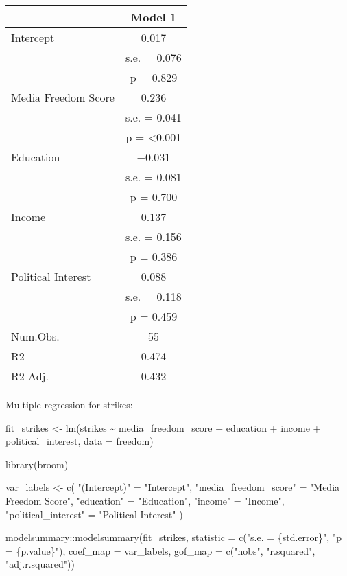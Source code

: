 \documentclass[
]{article}
\newenvironment{Shaded}{\begin{snugshade}}{\end{snugshade}}
\newcommand{\AttributeTok}[1]{\textcolor[rgb]{0.77,0.63,0.00}{#1}}
\newcommand{\FunctionTok}[1]{\textcolor[rgb]{0.00,0.00,0.00}{#1}}
\newcommand{\NormalTok}[1]{#1}
\newcommand{\OtherTok}[1]{\textcolor[rgb]{0.56,0.35,0.01}{#1}}
\newcommand{\SpecialCharTok}[1]{\textcolor[rgb]{0.00,0.00,0.00}{#1}}
\newcommand{\StringTok}[1]{\textcolor[rgb]{0.31,0.60,0.02}{#1}}
\begin{document}
\begin{table}
\centering
\begin{tabular}[t]{lc}
\toprule
  & Model 1\\
\midrule
Intercept & \num{0.017}\\
 & s.e. = \num{0.076}\\
 & p = \num{0.829}\\
Media Freedom Score & \num{0.236}\\
 & s.e. = \num{0.041}\\
 & p = \num{<0.001}\\
Education & \num{-0.031}\\
 & s.e. = \num{0.081}\\
 & p = \num{0.700}\\
Income & \num{0.137}\\
 & s.e. = \num{0.156}\\
 & p = \num{0.386}\\
Political Interest & \num{0.088}\\
 & s.e. = \num{0.118}\\
 & p = \num{0.459}\\
\midrule
Num.Obs. & \num{55}\\
R2 & \num{0.474}\\
R2 Adj. & \num{0.432}\\
\bottomrule
\end{tabular}
\end{table}

Multiple regression for strikes:

\begin{Shaded}
\begin{Highlighting}[]
\NormalTok{fit\_strikes }\OtherTok{\textless{}{-}} \FunctionTok{lm}\NormalTok{(strikes }\SpecialCharTok{\textasciitilde{}}\NormalTok{ media\_freedom\_score }\SpecialCharTok{+}\NormalTok{ education }\SpecialCharTok{+}\NormalTok{ income }\SpecialCharTok{+}\NormalTok{ political\_interest, }\AttributeTok{data =}\NormalTok{ freedom)}

\FunctionTok{library}\NormalTok{(broom)}

\NormalTok{var\_labels }\OtherTok{\textless{}{-}} \FunctionTok{c}\NormalTok{(}
    \StringTok{"(Intercept)"} \OtherTok{=} \StringTok{"Intercept"}\NormalTok{,}
    \StringTok{"media\_freedom\_score"} \OtherTok{=} \StringTok{"Media Freedom Score"}\NormalTok{,}
    \StringTok{"education"} \OtherTok{=} \StringTok{"Education"}\NormalTok{,}
    \StringTok{"income"} \OtherTok{=} \StringTok{"Income"}\NormalTok{,}
    \StringTok{"political\_interest"} \OtherTok{=} \StringTok{"Political Interest"}
\NormalTok{)}

\NormalTok{modelsummary}\SpecialCharTok{::}\FunctionTok{modelsummary}\NormalTok{(fit\_strikes,}
                             \AttributeTok{statistic =} \FunctionTok{c}\NormalTok{(}\StringTok{"s.e. = \{std.error\}"}\NormalTok{,}
               \StringTok{"p = \{p.value\}"}\NormalTok{),}
\AttributeTok{coef\_map =}\NormalTok{ var\_labels,}
\AttributeTok{gof\_map =} \FunctionTok{c}\NormalTok{(}\StringTok{"nobs"}\NormalTok{, }\StringTok{"r.squared"}\NormalTok{, }\StringTok{"adj.r.squared"}\NormalTok{))}
\end{Highlighting}
\end{Shaded}
\end{document}
